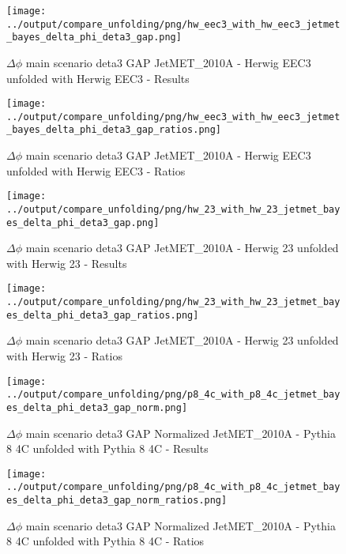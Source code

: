 \documentclass[11pt]{book}
\begin{document}
\begin{figure}[ht]
\centering
\texttt{[image: ../output/compare\_unfolding/png/hw\_eec3\_with\_hw\_eec3\_jetmet\_bayes\_delta\_phi\_deta3\_gap.png]}
\caption{$\Delta\phi$ main scenario deta3 GAP JetMET\_2010A - Herwig EEC3 unfolded with Herwig EEC3 - Results}
\label{hw_eec3_hw_eec3_jetmet_bayes_delta_phi_deta3_gap_a}
\end{figure}

\begin{figure}[ht]
\centering
\texttt{[image: ../output/compare\_unfolding/png/hw\_eec3\_with\_hw\_eec3\_jetmet\_bayes\_delta\_phi\_deta3\_gap\_ratios.png]}
\caption{$\Delta\phi$ main scenario deta3 GAP JetMET\_2010A - Herwig EEC3 unfolded with Herwig EEC3 - Ratios}
\label{hw_eec3_hw_eec3_jetmet_bayes_delta_phi_deta3_gap_b}
\end{figure}

\begin{figure}[ht]
\centering
\texttt{[image: ../output/compare\_unfolding/png/hw\_23\_with\_hw\_23\_jetmet\_bayes\_delta\_phi\_deta3\_gap.png]}
\caption{$\Delta\phi$ main scenario deta3 GAP JetMET\_2010A - Herwig 23 unfolded with Herwig 23 - Results}
\label{hw_23_hw_23_jetmet_bayes_delta_phi_deta3_gap_a}
\end{figure}

\begin{figure}[ht]
\centering
\texttt{[image: ../output/compare\_unfolding/png/hw\_23\_with\_hw\_23\_jetmet\_bayes\_delta\_phi\_deta3\_gap\_ratios.png]}
\caption{$\Delta\phi$ main scenario deta3 GAP JetMET\_2010A - Herwig 23 unfolded with Herwig 23 - Ratios}
\label{hw_23_hw_23_jetmet_bayes_delta_phi_deta3_gap_b}
\end{figure}


\begin{figure}[ht]
\centering
\texttt{[image: ../output/compare\_unfolding/png/p8\_4c\_with\_p8\_4c\_jetmet\_bayes\_delta\_phi\_deta3\_gap\_norm.png]}
\caption{$\Delta\phi$ main scenario deta3 GAP Normalized JetMET\_2010A - Pythia 8 4C unfolded with Pythia 8 4C - Results}
\label{p8_p8_jetmet_bayes_delta_phi_deta3_gap_norm_a}
\end{figure}

\begin{figure}[ht]
\centering
\texttt{[image: ../output/compare\_unfolding/png/p8\_4c\_with\_p8\_4c\_jetmet\_bayes\_delta\_phi\_deta3\_gap\_norm\_ratios.png]}
\caption{$\Delta\phi$ main scenario deta3 GAP Normalized JetMET\_2010A - Pythia 8 4C unfolded with Pythia 8 4C - Ratios}
\label{p8_p8_jetmet_bayes_delta_phi_deta3_gap_norm_b}
\end{figure}
\end{document}
